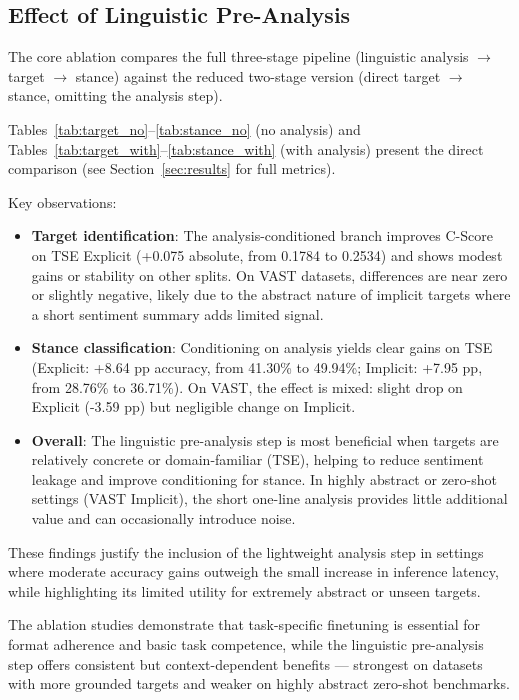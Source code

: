 \documentclass[conference]{IEEEtran}
\begin{document}
\subsection{Effect of Linguistic Pre-Analysis}

The core ablation compares the full three-stage pipeline (linguistic analysis $\to$ target $\to$ stance) against the reduced two-stage version (direct target $\to$ stance, omitting the analysis step).

Tables~\ref{tab:target_no}--\ref{tab:stance_no} (no analysis) and Tables~\ref{tab:target_with}--\ref{tab:stance_with} (with analysis) present the direct comparison (see Section~\ref{sec:results} for full metrics).

Key observations:
\begin{itemize}
    \item \textbf{Target identification}: The analysis-conditioned branch improves C-Score on TSE Explicit (+0.075 absolute, from 0.1784 to 0.2534) and shows modest gains or stability on other splits. On VAST datasets, differences are near zero or slightly negative, likely due to the abstract nature of implicit targets where a short sentiment summary adds limited signal.
    \item \textbf{Stance classification}: Conditioning on analysis yields clear gains on TSE (Explicit: +8.64 pp accuracy, from 41.30\% to 49.94\%; Implicit: +7.95 pp, from 28.76\% to 36.71\%). On VAST, the effect is mixed: slight drop on Explicit (-3.59 pp) but negligible change on Implicit.
    \item \textbf{Overall}: The linguistic pre-analysis step is most beneficial when targets are relatively concrete or domain-familiar (TSE), helping to reduce sentiment leakage and improve conditioning for stance. In highly abstract or zero-shot settings (VAST Implicit), the short one-line analysis provides little additional value and can occasionally introduce noise.
\end{itemize}

These findings justify the inclusion of the lightweight analysis step in settings where moderate accuracy gains outweigh the small increase in inference latency, while highlighting its limited utility for extremely abstract or unseen targets.

The ablation studies demonstrate that task-specific finetuning is essential for format adherence and basic task competence, while the linguistic pre-analysis step offers consistent but context-dependent benefits — strongest on datasets with more grounded targets and weaker on highly abstract zero-shot benchmarks.
\end{document}
